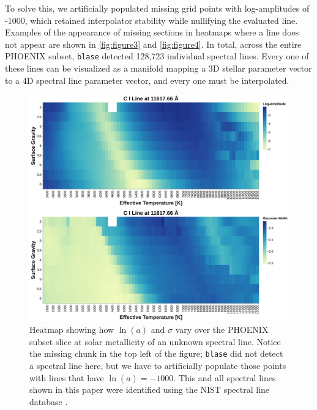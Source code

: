 \documentclass[twocolumn, linenumbers]{aastex631}
\begin{document}
To solve this, we artificially populated missing grid points with log-amplitudes of -1000, which retained interpolator stability while nullifying the evaluated line.
Examples of the appearance of missing sections in heatmaps where a line does not appear are shown in \autoref{fig:figure3} and \autoref{fig:figure4}.
In total, across the entire PHOENIX subset, \texttt{blase} detected 128,723 individual spectral lines.
Every one of these lines can be visualized as a manifold mapping a 3D stellar parameter vector to a 4D spectral line parameter vector, and every one must be interpolated.
\begin{figure}
    \centering
    \includegraphics[width=\textwidth]{figure3}
    \caption{Heatmap showing how $\ln(a)$ and $\sigma$ vary over the PHOENIX subset slice at solar metallicity of an unknown spectral line.
    Notice the missing chunk in the top left of the figure; \texttt{blase} did not detect a spectral line here, but we have to artificially populate those points with lines that have $\ln(a) = -1000$.
    This and all spectral lines shown in this paper were identified using the NIST spectral line database \citep{NIST}.}
    \label{fig:figure3}
\end{figure}
\end{document}

